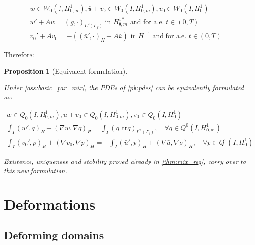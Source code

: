 \documentclass[english,a4paper,9pt,oneside]{scrbook}	%
\theoremstyle{break}
\newtheorem{prop}[equation]{Proposition}
\theoremstyle{remark}
\newcommand{\tr}{\text{tr}}
\begin{document}
\begin{appendices}
\begin{align*}
w \in W_0(I, H^1_{0,m}),\bar{u}+v_0 \in W_0(I,H^1_{0,m}), v_0 \in W_0(I,H^1_0)\\
w' + A w = (g,\cdot)_{L^2(\Gamma_f)} \text{ in }H^{1*}_{0,m} \text{ and for a.e. } t \in (0,T) \\
v_0' + A v_0 = -((\bar{u}',\cdot)_H+A \bar{u}) \text{ in }H^{-1} \text{ and for a.e. } t \in (0,T) 
\end{align*}

Therefore:

\begin{prop}[Equivalent formulation]
\label{prop:eq_form}

Under \cref{ass:basic_par_mix}, the PDEs of \cref{pb:pdes} can be equivalently formulated as:

\begin{align*}
w \in Q_0(I, H^1_{0,m}), \bar{u}+v_0 \in Q_0(I,H^1_{0,m}), v_0 \in Q_0(I,H^1_0) \\
\int_I ( w' , q)_H+ (\nabla w, \nabla q)_H = \int_I(g,\tr q)_{L^2(\Gamma_f)}, \quad \forall q \in Q^0(I, H^1_{0,m}) \\
\int_I (v_0',p)_H + (\nabla v_0, \nabla p)_H= -\int_I(\bar{u}',p)_H+(\nabla \bar{u}, \nabla p)_H, \quad \forall p \in Q^0(I, H^1_0) 
\end{align*}

Existence, uniqueness and stability proved already in  \cref{thm:mix_reg}, carry over to this new formulation.

\end{prop}

\chapter{Deformations}
\label{chap:domain_transformations}
\section{Deforming domains}


\end{appendices}
\end{document}
